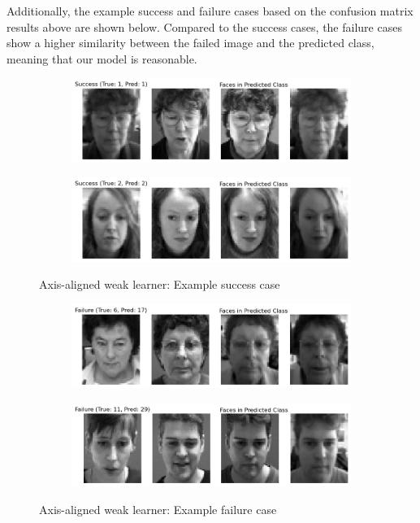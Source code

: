 Additionally, the example success and failure cases based on the confusion matrix results above are shown below. Compared to the success cases, the failure cases show a higher similarity between the failed image and the predicted class, meaning that our model is reasonable.
\begin{figure}
	\centering
	\begin{subfigure}{0.45\linewidth}
		\centering
		\includegraphics[width=\linewidth]{image/q5-app/q5-axis-succ1.png}
	\end{subfigure}%
	\quad
	\begin{subfigure}{0.45\linewidth}
		\centering
		\includegraphics[width=\linewidth]{image/q5-app/q5-axis-succ2.png}
	\end{subfigure}
	\caption{Axis-aligned weak learner: Example success case}
\end{figure}
\begin{figure}
	\centering
	\begin{subfigure}[t]{0.45\linewidth}
		\centering
		\includegraphics[width=\linewidth]{image/q5-app/q5-axis-fail1.png}
	\end{subfigure}%
	\quad
	\begin{subfigure}[t]{0.45\linewidth}
		\centering
		\includegraphics[width=\linewidth]{image/q5-app/q5-axis-fail2.png}
	\end{subfigure}
	\caption{Axis-aligned weak learner: Example failure case}
\end{figure}

